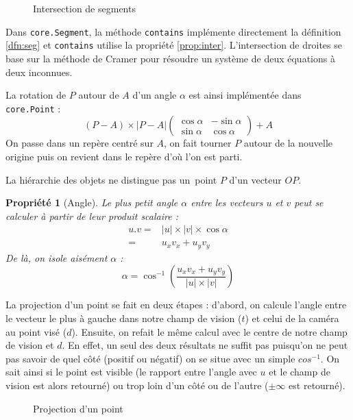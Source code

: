 \documentclass[12pt,twocolumn]{article}
\newtheorem{prop}{Propriété}
\begin{document}
\begin{figure}[h]
\center

\caption{Intersection de segments}
\end{figure}

Dans \texttt{core.Segment}, la méthode \texttt{contains}
implémente directement la définition \ref{dfn:seg}
et \texttt{contains} utilise la propriété \ref{prop:inter}.
L'intersection de droites se base sur la méthode de Cramer pour résoudre
un système de deux équations à deux inconnues.

La rotation de $P$ autour de $A$ d'un angle $\alpha$ est ainsi implémentée
dans \texttt{core.Point} :
\[
	(P-A) \times |P-A| \left(\begin{array}{cc}
	\cos\alpha & -\sin\alpha \\ \sin\alpha & \cos\alpha
	\end{array}\right)
	+ A
\]
On passe dans un repère centré sur $A$, on fait tourner $P$ autour de
la nouvelle origine puis on revient dans le repère d'où l'on est parti.

La hiérarchie des objets ne distingue pas un~point $P$ d'un vecteur $OP$.

\begin{prop}[Angle]
Le plus petit angle $\alpha$ entre les vecteurs $u$ et $v$ peut se calculer
à partir de leur produit scalaire :
\begin{align*}
	u.v = & |u|\times|v|\times\cos\alpha \\
	= & u_xv_x + u_yv_y
\end{align*}
De là, on isole aisément $\alpha$ :
\[
	\alpha = \cos^{-1}\left(\frac{u_xv_x + u_yv_y}{|u|\times|v|}\right)
\]
\end{prop}

La projection d'un point se fait en deux étapes : d'abord, on calcule l'angle
entre le vecteur le plus à gauche dans notre champ de vision ($t$) et celui
de la caméra au point visé ($d$). Ensuite, on refait le même calcul avec
le centre de notre champ de vision et $d$. En effet, un seul des deux résultats
ne suffit pas puisqu'on ne peut pas savoir de quel côté (positif ou négatif)
on se situe avec un simple $cos^{-1}$. On sait ainsi si le point est visible
(le rapport entre l'angle avec $u$ et le champ de vision est alors retourné)
ou trop loin d'un côté ou de l'autre ($\pm\infty$ est retourné).

\begin{figure}[h]
\center

\caption{Projection d'un point}
\end{figure}
\end{document}
